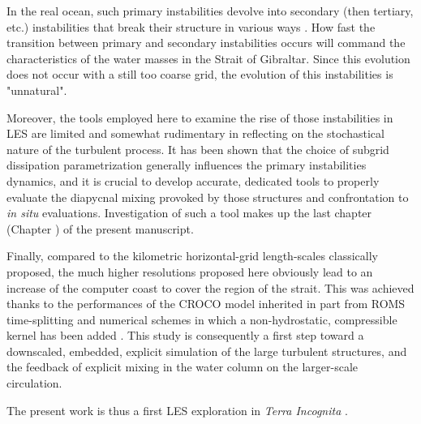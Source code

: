 In the real ocean, such primary instabilities devolve into secondary (then tertiary, etc.) instabilities that break their structure in various ways \citep{mashayek_2012}. How fast the transition between primary and secondary instabilities occurs will command the characteristics of the water masses in the Strait of Gibraltar. Since this evolution does not occur with a still too coarse grid, the evolution of this instabilities is "unnatural".

Moreover, the tools employed here to examine the rise of those instabilities in LES are limited and somewhat rudimentary in reflecting on the stochastical nature of the turbulent process. It has been shown that the choice of subgrid dissipation parametrization generally influences the primary instabilities dynamics, and it is crucial to develop accurate, dedicated tools to properly evaluate the diapycnal mixing provoked by those structures and confrontation to \textit{in situ} evaluations. Investigation of such a tool makes up the last chapter (Chapter ) of the present manuscript.

Finally, compared to the kilometric horizontal-grid length-scales classically proposed, the much higher resolutions proposed here obviously lead to an increase of the computer coast to cover the region of the strait. This was achieved thanks to the performances of the CROCO model inherited in part from ROMS time-splitting and numerical schemes \citep{shchepetkin_regional_2005} in which a non-hydrostatic, compressible kernel has been added \citep{Auclair2018, hilt_2020}. This study is consequently a first step toward a downscaled, embedded, explicit simulation of the large turbulent structures, and the feedback of explicit mixing in the water column on the larger-scale circulation.

The present work is thus a first LES exploration in \textit{Terra Incognita} \citep{scotti_large_2010, wyngaard_toward_2004}.